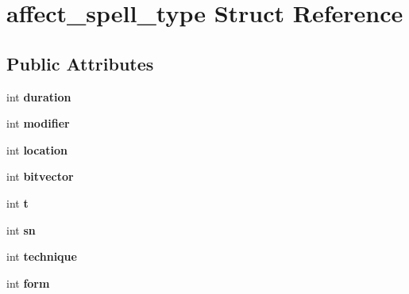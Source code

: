 \hypertarget{structaffect__spell__type}{\section{affect\-\_\-spell\-\_\-type Struct Reference}
\label{structaffect__spell__type}
}
\subsection*{Public Attributes}
\begin{DoxyCompactItemize}
\item 
\hypertarget{structaffect__spell__type_af86b0815a290a3cab381528de89b11e6}{int {\bfseries duration}}\label{structaffect__spell__type_af86b0815a290a3cab381528de89b11e6}

\item 
\hypertarget{structaffect__spell__type_aeb5f162c5a8ee87ccf02c8485522ea74}{int {\bfseries modifier}}\label{structaffect__spell__type_aeb5f162c5a8ee87ccf02c8485522ea74}

\item 
\hypertarget{structaffect__spell__type_a598b713a0035f8abe085db0e98d3ef00}{int {\bfseries location}}\label{structaffect__spell__type_a598b713a0035f8abe085db0e98d3ef00}

\item 
\hypertarget{structaffect__spell__type_af88fddc598f979d5237bf14153678a4e}{int {\bfseries bitvector}}\label{structaffect__spell__type_af88fddc598f979d5237bf14153678a4e}

\item 
\hypertarget{structaffect__spell__type_aae146ad6581652774e1832dac50765e2}{int {\bfseries t}}\label{structaffect__spell__type_aae146ad6581652774e1832dac50765e2}

\item 
\hypertarget{structaffect__spell__type_a6e4f95b92bc47e654b58a0ae8e3f1a2e}{int {\bfseries sn}}\label{structaffect__spell__type_a6e4f95b92bc47e654b58a0ae8e3f1a2e}

\item 
\hypertarget{structaffect__spell__type_a406584bf2087e984ce3082256fefed04}{int {\bfseries technique}}\label{structaffect__spell__type_a406584bf2087e984ce3082256fefed04}

\item 
\hypertarget{structaffect__spell__type_a33d1c31e416aff71414c03f51dea3e78}{int {\bfseries form}}\label{structaffect__spell__type_a33d1c31e416aff71414c03f51dea3e78}


\end{DoxyCompactItemize}
